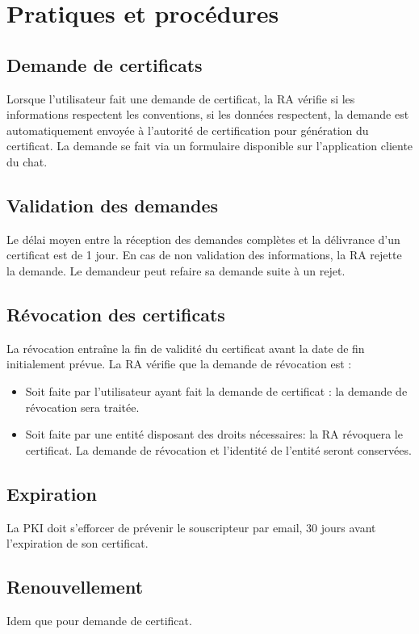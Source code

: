 \documentclass[a4paper,11pt,french]{book}
\begin{document}
\section{Pratiques et procédures}
\subsection{Demande de certificats}
Lorsque l'utilisateur fait une demande de certificat, la RA vérifie si les informations respectent les conventions, si les données
respectent, la demande est automatiquement envoyée à l'autorité de certification pour génération du certificat. La demande se fait via un formulaire disponible sur l'application cliente du chat.

\subsection{Validation  des demandes}
Le délai moyen entre la réception des demandes complètes et la délivrance d'un certificat est de 1 jour. En cas de non validation des informations, la RA rejette la demande. Le demandeur peut refaire sa demande suite à un rejet.

\subsection{Révocation des certificats}
La révocation entraîne la fin de validité du certificat avant la date de fin initialement prévue. La RA vérifie que la demande de révocation est :
\begin{itemize}
\item Soit faite par l'utilisateur ayant fait la demande de certificat :  la demande de révocation sera traitée.
\item Soit faite par une entité disposant des droits nécessaires: la RA révoquera le certificat. La demande de révocation et l'identité de l'entité seront conservées.
\end{itemize}

\subsection{Expiration}
La PKI doit s'efforcer de prévenir le souscripteur par email, 30 jours avant l'expiration de son certificat.

\subsection{Renouvellement}
Idem que pour demande de certificat.
\end{document}
